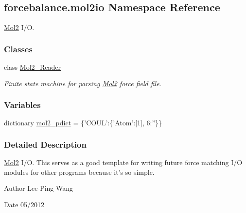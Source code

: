 \hypertarget{namespaceforcebalance_1_1mol2io}{\subsection{forcebalance.\-mol2io Namespace Reference}
\label{namespaceforcebalance_1_1mol2io}
}


\hyperlink{namespaceforcebalance_1_1Mol2}{Mol2} I/\-O.  


\subsubsection*{Classes}
\begin{DoxyCompactItemize}
\item 
class \hyperlink{classforcebalance_1_1mol2io_1_1Mol2__Reader}{Mol2\-\_\-\-Reader}
\begin{DoxyCompactList}\small\item\em Finite state machine for parsing \hyperlink{namespaceforcebalance_1_1Mol2}{Mol2} force field file. \end{DoxyCompactList}\end{DoxyCompactItemize}
\subsubsection*{Variables}
\begin{DoxyCompactItemize}
\item 
dictionary \hyperlink{namespaceforcebalance_1_1mol2io_a9a28a68a67a02946036ee03f9685f3ba}{mol2\-\_\-pdict} = \{'C\-O\-U\-L'\-:\{'Atom'\-:\mbox{[}1\mbox{]}, 6\-:''\}\}
\end{DoxyCompactItemize}


\subsubsection{Detailed Description}
\hyperlink{namespaceforcebalance_1_1Mol2}{Mol2} I/\-O. This serves as a good template for writing future force matching I/\-O modules for other programs because it's so simple.

\begin{DoxyAuthor}{Author}
Lee-\/\-Ping Wang 
\end{DoxyAuthor}
\begin{DoxyDate}{Date}
05/2012 
\end{DoxyDate}


